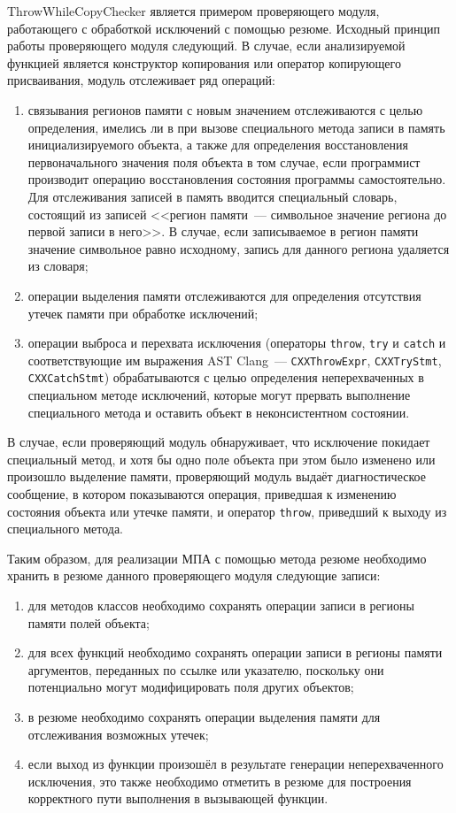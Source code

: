ThrowWhileCopyChecker является примером проверяющего модуля, работающего с обработкой исключений с помощью резюме. Исходный принцип работы проверяющего модуля следующий. В случае, если анализируемой функцией является конструктор копирования или оператор копирующего присваивания, модуль отслеживает ряд операций: 
\begin{enumerate}
 \item связывания регионов памяти с новым значением отслеживаются с целью определения, имелись ли в при вызове специального метода записи в память инициализируемого объекта, а также для определения восстановления первоначального значения поля объекта в том случае, если программист производит операцию восстановления состояния программы самостоятельно. Для отслеживания записей в память вводится специальный словарь, состоящий из записей <<регион памяти~--- символьное значение региона до первой записи в него>>. В случае, если записываемое в регион памяти значение символьное равно исходному, запись для данного региона удаляется из словаря;
 \item операции выделения памяти отслеживаются для определения отсутствия утечек памяти при обработке исключений;
 \item операции выброса и перехвата исключения (операторы \texttt{throw}, \texttt{try} и \texttt{catch} и соответствующие им выражения AST Clang~--- \texttt{CXXThrowExpr}, \texttt{CXXTryStmt}, \texttt{CXXCatchStmt}) обрабатываются с целью определения неперехваченных в специальном методе исключений, которые могут прервать выполнение специального метода и оставить объект в неконсистентном состоянии.
\end{enumerate}

В случае, если проверяющий модуль обнаруживает, что исключение покидает специальный метод, и хотя бы одно поле объекта при этом было изменено или произошло выделение памяти, проверяющий модуль выдаёт диагностическое сообщение, в котором показываются операция, приведшая к изменению состояния объекта или утечке памяти, и оператор \texttt{throw}, приведший к выходу из специального метода.

Таким образом, для реализации МПА с помощью метода резюме необходимо хранить в резюме данного проверяющего модуля следующие записи:

\begin{enumerate}
 \item для методов классов необходимо сохранять операции записи в регионы памяти полей объекта;
 \item для всех функций необходимо сохранять операции записи в регионы памяти аргументов, переданных по ссылке или указателю, поскольку они потенциально могут модифицировать поля других объектов;
 \item в резюме необходимо сохранять операции выделения памяти для отслеживания возможных утечек;
 \item если выход из функции произошёл в результате генерации неперехваченного исключения, это также необходимо отметить в резюме для построения корректного пути выполнения в вызывающей функции.
\end{enumerate}

